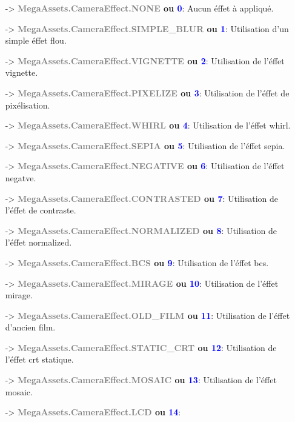 \documentclass[a4paper, 11pt]{article}
\begin{document}
	\begin{itemize}
		\item [-> \textbf{\textcolor{gray}{MegaAssets.CameraEffect.NONE} ou \textcolor{blue}{0}}:] Aucun 
		éffet à appliqué.
		\item [-> \textbf{\textcolor{gray}{MegaAssets.CameraEffect.SIMPLE\_BLUR} ou \textcolor{blue}{1}}:] 
		Utilisation d'un simple éffet flou.
		\item [-> \textbf{\textcolor{gray}{MegaAssets.CameraEffect.VIGNETTE} ou \textcolor{blue}{2}}:] 
		Utilisation de l'éffet vignette.
		\item [-> \textbf{\textcolor{gray}{MegaAssets.CameraEffect.PIXELIZE} ou \textcolor{blue}{3}}:] 
		Utilisation de l'éffet de pixélisation.
		\item [-> \textbf{\textcolor{gray}{MegaAssets.CameraEffect.WHIRL} ou \textcolor{blue}{4}}:] 
		Utilisation de l'éffet whirl.
		\item [-> \textbf{\textcolor{gray}{MegaAssets.CameraEffect.SEPIA} ou \textcolor{blue}{5}}:] 
		Utilisation de l'éffet sepia.
		\item [-> \textbf{\textcolor{gray}{MegaAssets.CameraEffect.NEGATIVE} ou \textcolor{blue}{6}}:] 
		Utilisation de l'éffet negatve.
		\item [-> \textbf{\textcolor{gray}{MegaAssets.CameraEffect.CONTRASTED} ou \textcolor{blue}{7}}:] 
		Utilisation de l'éffet de contraste.
		\item [-> \textbf{\textcolor{gray}{MegaAssets.CameraEffect.NORMALIZED} ou \textcolor{blue}{8}}:] 
		Utilisation de l'éffet normalized.
		\item [-> \textbf{\textcolor{gray}{MegaAssets.CameraEffect.BCS} ou \textcolor{blue}{9}}:] 
		Utilisation de l'éffet bcs.
		\item [-> \textbf{\textcolor{gray}{MegaAssets.CameraEffect.MIRAGE} ou \textcolor{blue}{10}}:] 
		Utilisation de l'éffet mirage.
		\item [-> \textbf{\textcolor{gray}{MegaAssets.CameraEffect.OLD\_FILM} ou \textcolor{blue}{11}}:] 
		Utilisation de l'éffet d'ancien film.
		\item [-> \textbf{\textcolor{gray}{MegaAssets.CameraEffect.STATIC\_CRT} ou \textcolor{blue}{12}}:] 
		Utilisation de l'éffet crt statique.
		\item [-> \textbf{\textcolor{gray}{MegaAssets.CameraEffect.MOSAIC} ou \textcolor{blue}{13}}:] 
		Utilisation de l'éffet mosaic.
		\item [-> \textbf{\textcolor{gray}{MegaAssets.CameraEffect.LCD} ou \textcolor{blue}{14}}:] 

\end{itemize}
\end{document}
